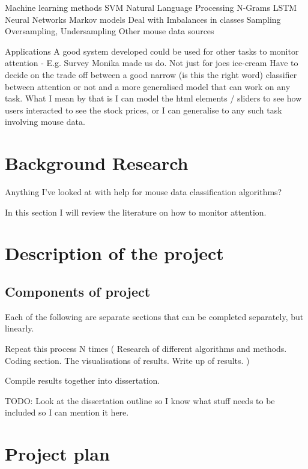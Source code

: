 \documentclass{article}
\begin{document}
Machine learning methods
    SVM
    Natural Language Processing
    N-Grams
    LSTM Neural Networks
    Markov models
Deal with Imbalances in classes
    Sampling
    Oversampling, Undersampling
Other mouse data sources

Applications
A good system developed could be used for other tasks to monitor attention - E.g. Survey Monika made us do. Not just for joes ice-cream
Have to decide on the trade off between a good narrow (is this the right word) classifier between attention or not and a more generalised model that can work on any task.
What I mean by that is I can model the html elements / sliders to see how users interacted to see the stock prices, or I can generalise to any such task involving mouse data.


\section{Background Research}
Anything I've looked at with help for mouse data classification algorithms? 

In this section I will review the literature on how to monitor attention.

\section{Description of the project}

\subsection{Components of project}
Each of the following are separate sections that can be completed separately, but linearly.

Repeat this process N times
(
Research of different algorithms and methods.
Coding section.
The visualisations of results.
Write up of results.
)

Compile results together into dissertation.

TODO: Look at the dissertation outline so I know what stuff needs to be included so I can mention it here.

\section{Project plan}
% 
\end{document}
